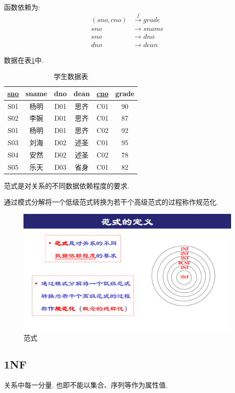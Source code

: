 函数依赖为:
\begin{align*}
  (sno,cno)&\overset{f}{\rightarrow} grade \\
  sno &\to sname \\
  sno &\to dno \\
  dno &\to dean
\end{align*}

数据在表\ref{tab:xuesheng1}中.

\begin{table}[H]
  \centering
  \begin{tabular}{|c|c|c|c|c|c|}
    \hline
    \underline{sno} & sname & dno & dean & \underline{cno} & grade \\
    \hline
    S01 & 杨明 & D01 & 思齐 & C01 & 90 \\ \hline
    S02 & 李婉 & D01 & 思齐 & C01 & 87 \\ \hline
    S01 & 杨明 & D01 & 思齐 & C02 & 92 \\ \hline
    S03 & 刘海 & D02 & 述圣 & C01 & 95 \\ \hline
    S04 & 安然 & D02 & 述圣 & C02 & 78 \\ \hline
    S05 & 乐天 & D03 & 省身 & C01 & 82 \\ \hline
  \end{tabular}
  \caption{学生数据表}
  \label{tab:xuesheng1}
\end{table}

\begin{definition}[范式]
  范式是对关系的不同数据依赖程度的要求.
\end{definition}

\begin{definition}[规范化]
  通过模式分解将一个低级范式转换为若干个高级范式的过程称作规范化.
\end{definition}

\begin{figure}[H]
    \centering
    \includegraphics[width=.25\textwidth]{./figure/范式.pdf}
    \caption{范式}
\end{figure}

\subsection{1NF}

\begin{definition}[1NF]
  关系中每一分量. 也即不能以集合、序列等作为属性值.
\end{definition}

